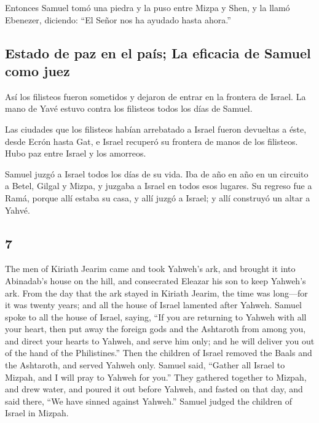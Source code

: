 \begin{paracol}{2}
 Entonces Samuel tomó una piedra y la puso entre Mizpa y
Shen, y la llamó Ebenezer, diciendo: ``El Señor nos ha ayudado hasta
ahora.''

\hypertarget{estado-de-paz-en-el-pauxeds-la-eficacia-de-samuel-como-juez}{%
\subsection{Estado de paz en el país; La eficacia de Samuel como
juez}\label{estado-de-paz-en-el-pauxeds-la-eficacia-de-samuel-como-juez}}

 Así los filisteos fueron sometidos y dejaron de entrar
en la frontera de Israel. La mano de Yavé estuvo contra los filisteos
todos los días de Samuel.

 Las ciudades que los filisteos habían arrebatado a
Israel fueron devueltas a éste, desde Ecrón hasta Gat, e Israel recuperó
su frontera de manos de los filisteos. Hubo paz entre Israel y los
amorreos.

 Samuel juzgó a Israel todos los días de su vida.
 Iba de año en año en un circuito a Betel, Gilgal y
Mizpa, y juzgaba a Israel en todos esos lugares.  Su
regreso fue a Ramá, porque allí estaba su casa, y allí juzgó a Israel; y
allí construyó un altar a Yahvé.

\switchcolumn
\begin{otherlanguage}{english}

\hypertarget{section-13}{%
\section{7}\label{section-13}}

 The men of Kiriath Jearim came and took Yahweh's ark, and
brought it into Abinadab's house on the hill, and consecrated Eleazar
his son to keep Yahweh's ark.  From the day that the ark
stayed in Kiriath Jearim, the time was long---for it was twenty years;
and all the house of Israel lamented after Yahweh.  Samuel
spoke to all the house of Israel, saying, ``If you are returning to
Yahweh with all your heart, then put away the foreign gods and the
Ashtaroth from among you, and direct your hearts to Yahweh, and serve
him only; and he will deliver you out of the hand of the Philistines.''
 Then the children of Israel removed the Baals and the
Ashtaroth, and served Yahweh only.  Samuel said, ``Gather
all Israel to Mizpah, and I will pray to Yahweh for you.''
 They gathered together to Mizpah, and drew water, and
poured it out before Yahweh, and fasted on that day, and said there,
``We have sinned against Yahweh.'' Samuel judged the children of Israel
in Mizpah.


\end{otherlanguage}
\end{paracol}
